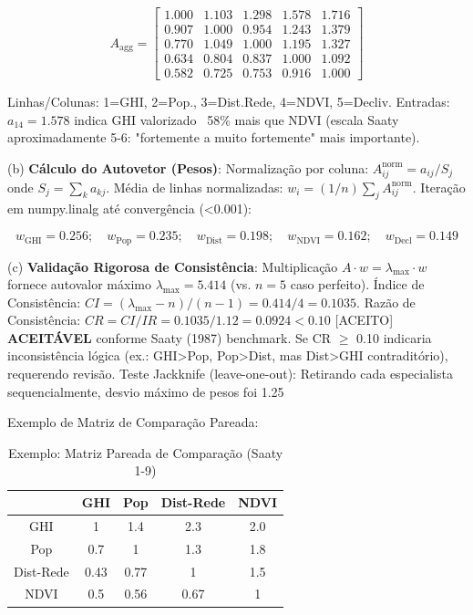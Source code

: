 \documentclass[12pt, a4paper]{article}
\begin{document}
\begin{equation}
A_{\text{agg}} = \begin{bmatrix}
1.000 & 1.103 & 1.298 & 1.578 & 1.716 \\
0.907 & 1.000 & 0.954 & 1.243 & 1.379 \\
0.770 & 1.049 & 1.000 & 1.195 & 1.327 \\
0.634 & 0.804 & 0.837 & 1.000 & 1.092 \\
0.582 & 0.725 & 0.753 & 0.916 & 1.000
\end{bmatrix}
\end{equation}

Linhas/Colunas: 1=GHI, 2=Pop., 3=Dist.Rede, 4=NDVI, 5=Decliv. Entradas: $a_{14}=1.578$ indica GHI valorizado ~58\% mais que NDVI (escala Saaty aproximadamente 5-6: "fortemente a muito fortemente" mais importante).

(b) \textbf{Cálculo do Autovetor (Pesos)}: Normalização por coluna: $A^{\text{norm}}_{ij} = a_{ij}/S_j$ onde $S_j = \sum_k a_{kj}$. Média de linhas normalizadas: $w_i = (1/n) \sum_j A^{\text{norm}}_{ij}$. Iteração em numpy.linalg até convergência (<0.001):

\begin{equation}
w_{\text{GHI}} = 0.256; \quad w_{\text{Pop}} = 0.235; \quad w_{\text{Dist}} = 0.198; \quad w_{\text{NDVI}} = 0.162; \quad w_{\text{Decl}} = 0.149
\end{equation}

(c) 
\textbf{Validação Rigorosa de Consistência}: Multiplicação $A \cdot w = \lambda_{\max} \cdot w$ fornece autovalor máximo $\lambda_{\max} = 5.414$ (vs. $n=5$ caso perfeito). Índice de Consistência: $CI = (\lambda_{\max} - n)/(n-1) = 0.414/4 = 0.1035$. Razão de Consistência: $CR = CI/IR = 0.1035/1.12 = 0.0924 < 0.10$ [ACEITO] 
\textbf{ACEITÁVEL} conforme Saaty (1987) benchmark. Se CR $\geq$ 0.10 indicaria inconsistência lógica (ex.: GHI>Pop, Pop>Dist, mas Dist>GHI contraditório), requerendo revisão. Teste Jackknife (leave-one-out): Retirando cada especialista sequencialmente, desvio máximo de pesos foi 1.25%

Exemplo de Matriz de Comparação Pareada:

\begin{table}[H]
\centering
\caption{Exemplo: Matriz Pareada de Comparação (Saaty 1-9)}
\footnotesize
\begin{tabular}{|c|c|c|c|c|}
\hline
 & GHI & Pop & Dist-Rede & NDVI \\
\hline
GHI & 1 & 1.4 & 2.3 & 2.0 \\
\hline
Pop & 0.7 & 1 & 1.3 & 1.8 \\
\hline
Dist-Rede & 0.43 & 0.77 & 1 & 1.5 \\
\hline
NDVI & 0.5 & 0.56 & 0.67 & 1 \\
\hline
\end{tabular}
\end{table}
\end{document}
